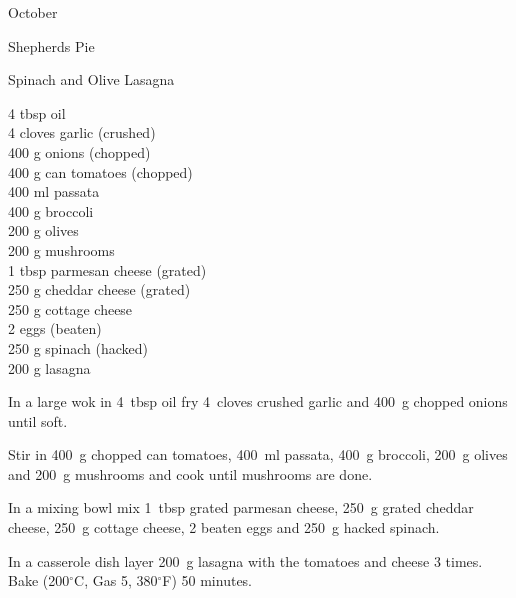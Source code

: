 \begin{menu}{October}
\begin{recipe}{2}{Shepherds Pie}
\begin{instructions}
    \end{instructions}
    \end{recipe}%
  
    \begin{recipe}{2}{Spinach and Olive Lasagna}%
		\begin{ingredients}
		4 tbsp oil  \\
	4 cloves garlic (crushed) \\
	400 g onions (chopped) \\
	400 g can tomatoes (chopped) \\
	400 ml passata  \\
	400 g broccoli  \\
	200 g olives  \\
	200 g mushrooms  \\
	1 tbsp parmesan cheese (grated) \\
	250 g cheddar cheese (grated) \\
	250 g cottage cheese  \\
	2  eggs (beaten) \\
	250 g spinach (hacked) \\
	200 g lasagna  \\
	
		\end{ingredients}
	
	
	
    \begin{instructions}
    \item 
        In a
        large wok
        in
        4~tbsp  oil
        fry
        4~cloves crushed garlic
        and
        400~g chopped onions
        until soft.
      \item 
        Stir in
        400~g chopped can tomatoes,
        400~ml  passata,
        400~g  broccoli,
        200~g  olives
        and
        200~g  mushrooms
        and cook until mushrooms are done.
      \item 
        In a mixing bowl mix
        1~tbsp grated parmesan cheese,
        250~g grated cheddar cheese,
        250~g  cottage cheese,
        2 beaten eggs
        and
        250~g hacked spinach.
      \item 
        In a casserole dish layer
        200~g  lasagna
        with the tomatoes and cheese 3 times.
        Bake (200$^{\circ}$C, Gas 5, 380$^{\circ}$F) 50 minutes.
      

\end{instructions}
\end{recipe}
\end{menu}
